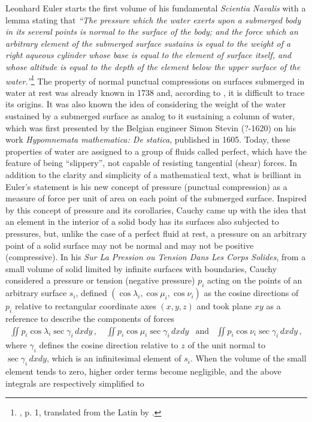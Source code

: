 Leonhard Euler starts the first volume of his fundamental \emph{Scientia Navalis} with a lemma stating that \emph{``The pressure which the water exerts upon a submerged body in its several points is normal to the surface of the body; and the force which an arbitrary element of the submerged surface sustains is equal to the weight of a right aqueous cylinder whose base is equal to the element of surface itself, and whose altitude is equal to the depth of the element below the upper surface of the water.''}\footnote{\cite{euler_1749_1}, p. 1, translated from the Latin by \cite{truesdell_1954_1}.} The property of normal punctual compressions on surfaces submerged in water at rest was already known in 1738 and, according to \cite{truesdell_1954_1}, it is difficult to trace its origins. It was also known the idea of considering the weight of the water sustained by a submerged surface as analog to it sustaining a column of water, which was first presented by the Belgian engineer Simon Stevin (?-1620) on his work \emph{Hypomnemata mathematica: De statica}, published in 1605. Today, these properties of water are assigned to a group of fluids called perfect, which have the feature of being ``slippery'', not capable of resisting tangential (shear) forces. In addition to the clarity and simplicity of a mathematical text, what is brilliant in Euler's statement is his new concept of pressure (punctual compression) as a measure of force per unit of area on each point of the submerged surface. Inspired by this concept of pressure and its corollaries, Cauchy came up with the idea that an element in the interior of a solid body has its surfaces also subjected to pressures, but, unlike the case of a perfect fluid at rest, a pressure on an arbitrary point of a solid surface may not be normal and may not be positive (compressive).  In his \emph{Sur La Pression ou Tension Dans Les Corps Solides}, from a small volume of solid limited by infinite surfaces with boundaries, Cauchy considered a pressure or tension (negative pressure) $p_i$ acting on the points of an arbitrary surface $s_i$, defined $(\cos\lambda_i,\cos\mu_i,\cos\nu_i)$ as the cosine directions of $p_i$ relative to rectangular coordinate axes $(x,y,z)$ and took plane $xy$ as a reference to describe the components of forces
\begin{eqnarray*}
\iint p_i\cos\lambda_i\sec\gamma_i\,dxdy\,, \quad \iint p_i\cos\mu_i\sec\gamma_i\,dxdy &\text{and}& \iint p_i\cos\nu_i\sec\gamma_i\,dxdy\,,
\end{eqnarray*}
where $\gamma_i$ defines the cosine direction relative to $z$ of the unit normal to $\sec\gamma_i\,dxdy$, which is an infinitesimal element of $s_i$. When the volume of the small element tends to zero, higher order terms become negligible, and the above integrals are respectively simplified to        
